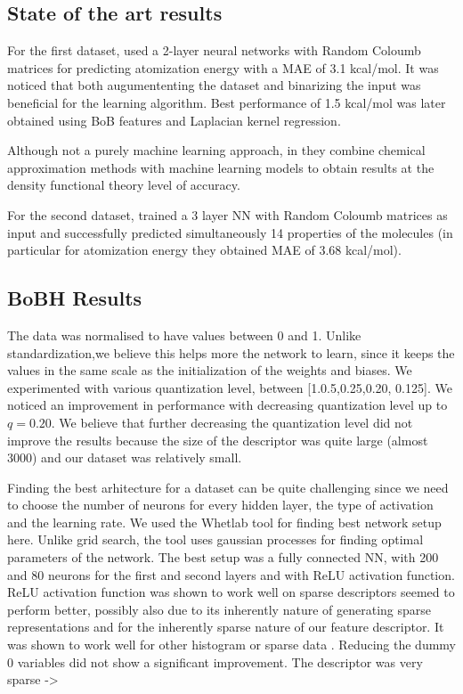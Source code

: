 \documentclass{article}
\begin{document}
\subsection{State of the art results}
For the first dataset,  \cite{montavon2012learning} used a 2-layer neural networks with Random Coloumb matrices for predicting atomization energy with a MAE of 3.1 kcal/mol.
It was noticed that both augumententing the dataset and binarizing the input was beneficial for the learning algorithm. Best performance of 1.5 kcal/mol was later obtained using BoB\citep{bob} features and Laplacian kernel regression.

Although not a purely machine learning approach, in \cite{falsebigdata} they combine chemical approximation methods with machine learning models to obtain results at the density functional theory level of accuracy.

For the second dataset,\cite{montavon2012learning} trained a 3 layer NN with Random Coloumb matrices as input and successfully predicted simultaneously 14 properties of the molecules (in particular for atomization energy they obtained MAE of 3.68 kcal/mol).


\subsection{BoBH Results}
The data was normalised to have values between 0 and 1. Unlike standardization,we believe this helps more the network to learn, since it keeps the values in the same scale as the initialization of the weights and biases.
We experimented with various quantization level, between [1.0.5,0.25,0.20, 0.125]. We noticed an improvement in performance with decreasing quantization level up to  $q=0.20$. We believe that further decreasing the quantization level did not improve the results because the size of the descriptor was quite large (almost 3000) and our dataset was relatively small. 

Finding the best arhitecture for a dataset can be quite challenging since we need to choose the number of neurons for every hidden layer, the type of activation and the learning rate.
We used the Whetlab tool for finding best network setup \citep{whetlab} here. Unlike grid search, the tool uses gaussian processes for finding optimal parameters of the network.
The best setup was a fully connected NN, with 200 and 80 neurons for the first and second layers and with ReLU activation function. 
ReLU activation function was shown to work well on sparse descriptors seemed to perform better, possibly also due to its inherently nature of generating sparse representations and for the inherently sparse nature of our feature descriptor. It was shown to work well for other histogram or sparse data \cite{relu}. Reducing the dummy 0 variables did not show a significant improvement. The descriptor was very sparse ->
\end{document}
